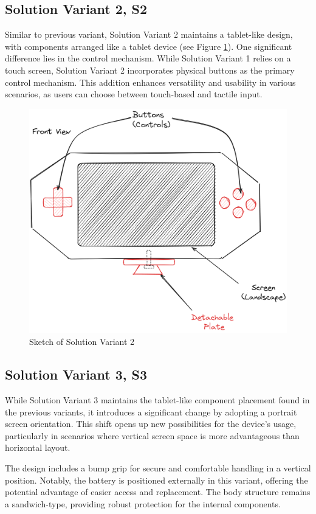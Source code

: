 \subsection{Solution Variant 2, S2}
Similar to previous variant, Solution Variant 2 maintains a tablet-like design, with components arranged like a tablet device (see Figure \ref{fig:sketch-solution-variant-2}). One significant difference lies in the control mechanism. While Solution Variant 1 relies on a touch screen, Solution Variant 2 incorporates physical buttons as the primary control mechanism. This addition enhances versatility and usability in various scenarios, as users can choose between touch-based and tactile input.

\begin{figure}[H]
    \centering
    \includegraphics[width=0.55\linewidth]{texs/Part1/chapter3/image/v2.png}
    \caption{Sketch of Solution Variant 2}
    \label{fig:sketch-solution-variant-2}
\end{figure}

\subsection{Solution Variant 3, S3}
While Solution Variant 3 maintains the tablet-like component placement found in the previous variants, it introduces a significant change by adopting a portrait screen orientation. This shift opens up new possibilities for the device's usage, particularly in scenarios where vertical screen space is more advantageous than horizontal layout.

The design includes a bump grip for secure and comfortable handling in a vertical position. Notably, the battery is positioned externally in this variant, offering the potential advantage of easier access and replacement. The body structure remains a sandwich-type, providing robust protection for the internal components.

